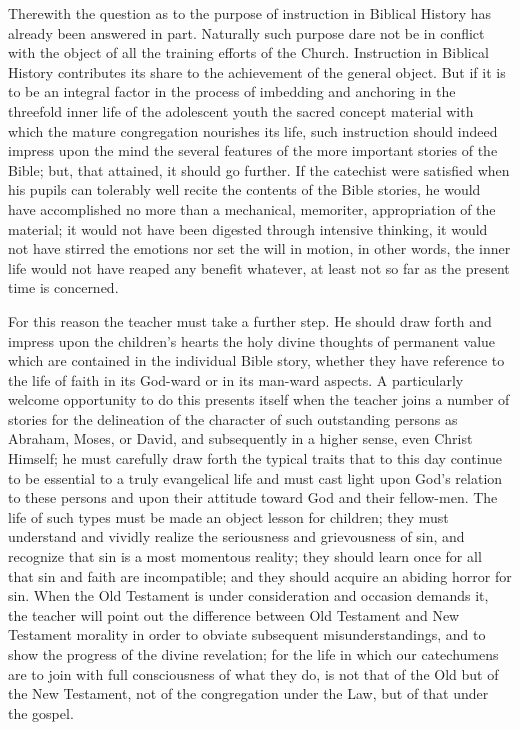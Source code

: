 Therewith the question as to the purpose of instruction in Biblical History has already been answered in part. Naturally such purpose dare not be in conflict with the object of all the training efforts of the Church. Instruction in Biblical History contributes its share to the achievement of the general object. But if it is to be an integral factor in the process of imbedding and anchoring in the threefold inner life of the adolescent youth the sacred concept material with which the mature congregation nourishes its life, such instruction should indeed impress upon the mind the several features of the more important stories of the Bible; but, that attained, it should go further. If the catechist were satisfied when his pupils can tolerably well recite the contents of the Bible stories, he would have accomplished no more than a mechanical, memoriter, appropriation of the material; it would not have been digested through intensive thinking, it would not have stirred the emotions nor set the will in motion, in other words, the inner life would not have reaped any benefit whatever, at least not so far as the present time is concerned.

For this reason the teacher must take a further step. He should draw forth and impress upon the children’s hearts the holy divine thoughts of permanent value which are contained
in the individual Bible story, whether they have reference to the life of faith in its God-ward or in its man-ward aspects. A particularly welcome opportunity to do this presents itself when the teacher joins a number of stories for the delineation of the character of such outstanding persons as Abraham, Moses, or David, and subsequently in a higher sense, even Christ Himself; he must carefully draw forth the typical traits that to this day continue to be essential to a truly evangelical life and must cast light upon God’s relation to these persons and upon their attitude toward God and their fellow-men. The life of such types must be made an object lesson for children; they must understand and vividly realize the seriousness and grievousness of sin, and recognize that sin is a most momentous reality; they should learn once for all that sin and faith are incompatible; and they should acquire an abiding horror for sin. When the Old Testament is under consideration and occasion demands it, the teacher will point out the difference between Old Testament and New Testament morality in order to obviate subsequent misunderstandings, and to show the progress of the divine revelation; for the life in which our catechumens are to join with full consciousness of what they do, is not that of the Old but of the New Testament, not of the congregation under the Law, but of that under the gospel.

